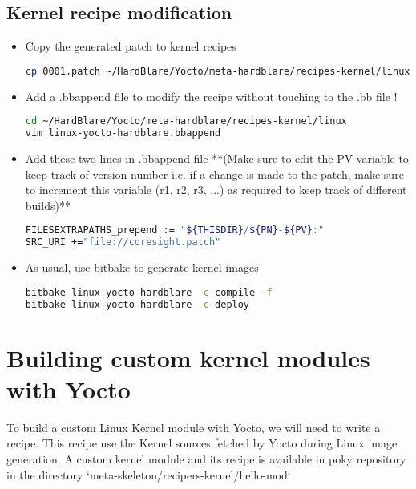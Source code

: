 \subsection{Kernel recipe modification}
\begin{itemize}
	\item  Copy the generated patch to kernel recipes 
\begin{lstlisting}[language=bash]
cp 0001.patch ~/HardBlare/Yocto/meta-hardblare/recipes-kernel/linux/linux-yocto-hardblare/name_of_patch.patch
\end{lstlisting}
	\item  Add a .bbappend file to modify the recipe without touching to the .bb file ! 
\begin{lstlisting}[language=bash]
cd ~/HardBlare/Yocto/meta-hardblare/recipes-kernel/linux
vim linux-yocto-hardblare.bbappend 
\end{lstlisting}
	\item  Add these two lines in .bbappend file **(Make sure to edit the PV variable to keep track of version number i.e. if a change is made to the patch, make sure to increment this variable (r1, r2, r3, ...) as required to keep track of different builds)**
\begin{lstlisting}[language=bash]
FILESEXTRAPATHS_prepend := "${THISDIR}/${PN}-${PV}:"
SRC_URI +="file://coresight.patch"
\end{lstlisting}
	\item  As usual, use bitbake to generate kernel images
\begin{lstlisting}[language=bash]
bitbake linux-yocto-hardblare -c compile -f 
bitbake linux-yocto-hardblare -c deploy 
\end{lstlisting}
\end{itemize}


\section{Building custom kernel modules with Yocto}

To build a custom Linux Kernel module with Yocto, we will need to write a recipe. This recipe use the Kernel sources fetched by Yocto during Linux image generation. A custom kernel module and its recipe is available in poky repository in the directory `meta-skeleton/recipers-kernel/hello-mod`

